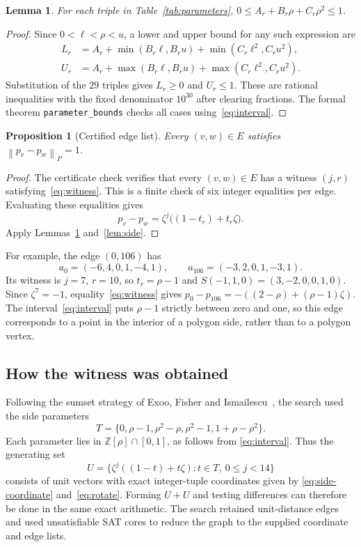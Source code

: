 \documentclass[11pt,a4paper]{article}
\newtheorem{proposition}[theorem]{Proposition}
\newtheorem{lemma}[theorem]{Lemma}
\theoremstyle{remark}
\newcommand{\Z}{\mathbb Z}
\newcommand{\pn}[1]{\left\lVert #1\right\rVert_{P}}
\newcommand{\code}[1]{\texttt{#1}}
\begin{document}
\begin{samepage}
\begin{lemma}\label{lem:parameters}
For each triple in Table~\ref{tab:parameters},
$0\leq A_r+B_r\rho+C_r\rho^2\leq1$.
\end{lemma}
\begin{proof}
Since $0<\ell<\rho<u$, a lower and upper bound for any such expression are
\begin{align*}
 L_r&=A_r+\min(B_r\ell,B_ru)+\min(C_r\ell^2,C_ru^2),\\
 U_r&=A_r+\max(B_r\ell,B_ru)+\max(C_r\ell^2,C_ru^2).
\end{align*}
Substitution of the $29$ triples gives $L_r\geq0$ and $U_r\leq1$.
These are rational inequalities with the fixed denominator $10^{30}$
after clearing fractions. The formal theorem \code{parameter\_bounds}
checks all cases using~\eqref{eq:interval}.
\end{proof}
\end{samepage}

\begin{samepage}
\begin{proposition}[Certified edge list]\label{prop:edges}
Every $(v,w)\in E$ satisfies $\pn{p_v-p_w}=1$.
\end{proposition}
\begin{proof}
The certificate check verifies that every $(v,w)\in E$ has a witness
$(j,r)$ satisfying~\eqref{eq:witness}. This is a finite check of six
integer equalities per edge. Evaluating these equalities gives
\[
 p_v-p_w=\zeta^j\bigl((1-t_r)+t_r\zeta\bigr).
\]
Apply Lemmas~\ref{lem:parameters} and~\ref{lem:side}.
\end{proof}
\end{samepage}

For example, the edge $(0,106)$ has
\[
 a_0=(-6,4,0,1,-4,1),\qquad a_{106}=(-3,2,0,1,-3,1).
\]
Its witness is $j=7$, $r=10$, so $t_r=\rho-1$ and
$S(-1,1,0)=(3,-2,0,0,1,0)$.
Since $\zeta^7=-1$, equality~\eqref{eq:witness} gives
$p_0-p_{106}=-((2-\rho)+(\rho-1)\zeta)$.
The interval~\eqref{eq:interval} puts $\rho-1$ strictly between zero and
one, so this edge corresponds to a point in the interior of a polygon
side, rather than to a polygon vertex.

\subsection{How the witness was obtained}

Following the sumset strategy of Exoo, Fisher and Ismailescu~\cite{efi},
the search used the side parameters
\[
 T=\{0,\rho-1,\rho^2-\rho,\rho^2-1,1+\rho-\rho^2\}.
\]
Each parameter lies in $\Z[\rho]\cap[0,1]$, as follows from
\eqref{eq:interval}. Thus the generating set
\[
 U=\{\zeta^j((1-t)+t\zeta):t\in T,\ 0\leq j<14\}
\]
consists of unit vectors with exact integer-tuple coordinates given by
\eqref{eq:side-coordinate} and~\eqref{eq:rotate}. Forming $U+U$ and
testing differences can therefore be done in the same exact arithmetic.
The search retained unit-distance edges and used unsatisfiable SAT cores
to reduce the graph to the supplied coordinate and edge lists.
\end{document}
